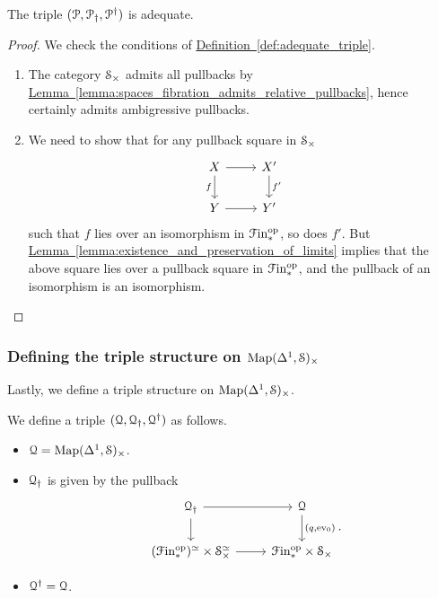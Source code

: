 \documentclass[main.tex]{subfiles}
\begin{document}
\begin{proposition}
  The triple $\triple{P}$ is adequate.
\end{proposition}
\begin{proof}
  We check the conditions of \hyperref[def:adequate_triple]{Definition~\ref*{def:adequate_triple}}.
  \begin{enumerate}
    \item The category $\S_{\times}$ admits all pullbacks by \hyperref[lemma:spaces_fibration_admits_relative_pullbacks]{Lemma~\ref*{lemma:spaces_fibration_admits_relative_pullbacks}}, hence certainly admits ambigressive pullbacks.

    \item We need to show that for any pullback square in $\S_{\times}$
      \begin{equation*}
        \begin{tikzcd}
          X
          \arrow[r]
          \arrow[d, swap, "f"]
          & X'
          \arrow[d, "f'"]
          \\
          Y
          \arrow[r]
          & Y'
        \end{tikzcd}
      \end{equation*}
      such that $f$ lies over an isomorphism in $\Finp\op$, so does $f'$. But \hyperref[lemma:existence_and_preservation_of_limits]{Lemma~\ref*{lemma:existence_and_preservation_of_limits}} implies that the above square lies over a pullback square in $\Finp\op$, and the pullback of an isomorphism is an isomorphism.
  \end{enumerate}
\end{proof}

\subsubsection{Defining the triple structure on \texorpdfstring{$\Map(\Delta^{1}, \S)_{\times}$}{Map}}

Lastly, we define a triple structure on $\Map(\Delta^{1}, \S)_{\times}$.
\begin{definition}
  We define a triple $\triple{Q}$ as follows.
  \begin{itemize}
    \item $\mathcal{Q} = \Map(\Delta^{1}, \S)_{\times}$.

    \item $\mathcal{Q}\downdag$ is given by the pullback
      \begin{equation*}
        \begin{tikzcd}
          \mathcal{Q}\downdag
          \arrow[r]
          \arrow[d]
          & \mathcal{Q}
          \arrow[d, "{(q, \ev_{0})}"]
          \\
          (\Finp\op)^{\simeq} \times \S_{\times}^{\simeq}
          \arrow[r]
          & \Finp\op \times \S_{\times}
        \end{tikzcd}.
      \end{equation*}

    \item $\mathcal{Q}\updag = \mathcal{Q}$.
  \end{itemize}
\end{definition}
\end{document}
